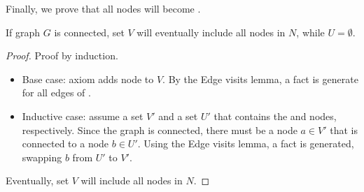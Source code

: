 Finally, we prove that all nodes will become .

\begin{theorem}
If graph $G$ is connected, set $V$ will eventually include all nodes in $N$,
while $U = \emptyset$.
\end{theorem}
\begin{proof}
Proof by induction.

\begin{itemize}
   \item Base case: axiom  adds node  to $V$. By
   the Edge visits lemma, a  fact is generate for all edges of
   .
   \item Inductive case: assume a set $V'$ and a set $U'$ that contains the
    and  nodes, respectively. Since the graph
   is connected, there must be a node $a \in V'$ that is connected to a node $b
   \in U'$. Using the Edge visits lemma, a  fact is generated,
   swapping $b$ from $U'$ to $V'$.
\end{itemize}

Eventually, set $V$ will include all nodes in $N$.
\end{proof}


